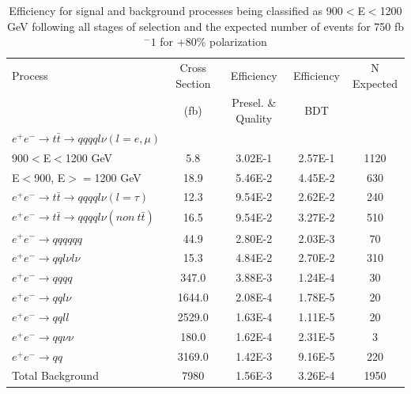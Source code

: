 \begin{table}
  \centering
  \begin{tabular}{l | c | c | c | c}
    \toprule
    Process     & Cross Section & Efficiency & Efficiency & N Expected\\
         & (fb) & Presel. \& Quality & BDT & \\
    \midrule
    $e^+e^-\rightarrow t\bar{t} \rightarrow qqqql\nu (l=e,\mu)$ &  & \\
    900$<$E$<$1200 GeV & 5.8 & 3.02E-1 & 2.57E-1 & 1120\\
    E$<$900, E$>=$1200 GeV & 18.9 & 5.46E-2& 4.45E-2& 630\\
   \midrule
    $e^+e^-\rightarrow t\bar{t} \rightarrow qqqql\nu (l=\tau)$& 12.3 & 9.54E-2 & 2.62E-2& 240\\
    \midrule
    $e^+e^-\rightarrow t\bar{t} \rightarrow qqqql\nu (non ~ t\bar{t})$& 16.5 & 9.54E-2 & 3.27E-2 & 510\\
    \midrule
    $e^+e^-\rightarrow qqqqqq$ & 44.9 & 2.80E-2 & 2.03E-3 & 70 \\
    \midrule
    $e^+e^-\rightarrow qql\nu l\nu$ & 15.3  & 4.84E-2 & 2.70E-2 & 310 \\
    \midrule
    $e^+e^-\rightarrow qqqq$ & 347.0 & 3.88E-3 & 1.24E-4 & 30 \\
    \midrule
    $e^+e^-\rightarrow qql\nu$ & 1644.0 & 2.08E-4& 1.78E-5 & 20\\
    \midrule
    $e^+e^-\rightarrow qqll$ & 2529.0 & 1.63E-4 & 1.11E-5 & 20 \\
    \midrule
    $e^+e^-\rightarrow qq\nu\nu$ & 180.0 & 1.62E-4 & 2.31E-5 & 3 \\
    \midrule
    $e^+e^-\rightarrow qq$ & 3169.0 & 1.42E-3 & 9.16E-5 & 220 \\
    \midrule
    \midrule
    Total Background & 7980 & 1.56E-3& 3.26E-4&  1950 \\
    \bottomrule
  \end{tabular}
  \caption{Efficiency for signal and background processes being classified as 900$<$E$<$1200 GeV following all stages of selection and the expected number of events for 750 fb$^-1$ for +80\% polarization}
  \label{table:topfinalefficienciesposMidE}
\end{table}


